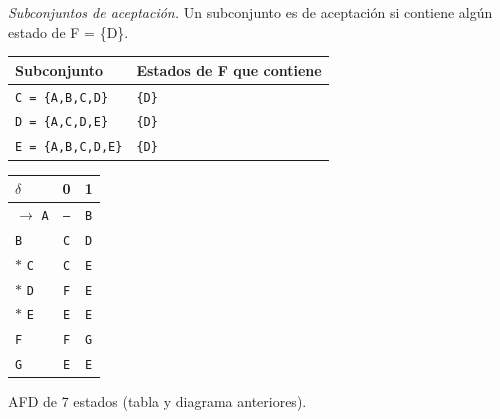 \documentclass[11pt]{article}
\begin{document}
\textit{Subconjuntos de aceptación.} Un subconjunto es de aceptación si contiene algún estado de F = \{D\}.
\begin{center}\footnotesize\begin{tabular}{ll}\toprule
Subconjunto & Estados de F que contiene \\\midrule
\texttt{C = \{A,B,C,D\}} & \texttt{\{D\}} \\
\texttt{D = \{A,C,D,E\}} & \texttt{\{D\}} \\
\texttt{E = \{A,B,C,D,E\}} & \texttt{\{D\}} \\
\bottomrule\end{tabular}\end{center}
\begin{center}\small\begin{tabular}{lcc}\toprule
$\delta$ & 0 & 1 \\\midrule
$\to$ \texttt{A} & \texttt{--} & \texttt{B} \\
 \texttt{B} & \texttt{C} & \texttt{D} \\
$*$ \texttt{C} & \texttt{C} & \texttt{E} \\
$*$ \texttt{D} & \texttt{F} & \texttt{E} \\
$*$ \texttt{E} & \texttt{E} & \texttt{E} \\
 \texttt{F} & \texttt{F} & \texttt{G} \\
 \texttt{G} & \texttt{E} & \texttt{E} \\
\bottomrule\end{tabular}\end{center}

\resp AFD de 7 estados (tabla y diagrama anteriores).
\end{document}
